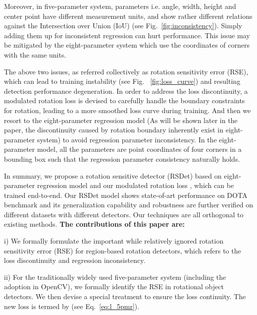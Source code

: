 \documentclass[10pt,twocolumn,letterpaper]{article}
\begin{document}
Moreover, in five-parameter system, parameters i.e. angle, width, height and center point have different measurement units, and show rather different relations against the Intersection over Union (IoU) (see Fig.~\ref{fig:inconsistency}). Simply adding them up for inconsistent regression can hurt performance. This issue may be mitigated by the eight-parameter system which use the coordinates of corners with the same units.

The above two issues, as referred collectively as rotation sensitivity error (RSE), which can lead to training instability (see Fig. ~\ref{fig:loss_curve}) and resulting detection performance degeneration. In order to address the loss discontinuity, a modulated rotation loss  is devised to carefully handle the boundary constraints for rotation, leading to a more smoothed loss curve during training. And then we resort to the eight-parameter regression model  \cite{liao2018rotation,Zhou2017EAST,zhang2019look,he2017deep} (As will be shown later in the paper, the discontinuity caused by rotation boundary inherently exist in eight-parameter system) to avoid regression parameter inconsistency. In the eight-parameter model, all the parameters are point coordinates of four corners in a bounding box such that the regression parameter consistency naturally holds.

In summary, we propose a rotation sensitive detector (RSDet) based on eight-parameter regression model and our modulated rotation loss , which can be trained end-to-end. Our RSDet model shows state-of-art performance on DOTA benchmark and its generalization capability and robustness are further verified on different datasets with different detectors. Our techniques are all orthogonal to existing methods. \textbf{The contributions of this paper are:}


    i) We formally formulate the important while relatively ignored rotation sensitivity error (RSE) for region-based rotation detectors, which refers to the loss discontinuity and regression inconsistency.


    ii) For the traditionally widely used five-parameter system (including the adoption in OpenCV), we formally identify the RSE in rotational object detectors. We then devise a special treatment to ensure the loss continuity. The new loss is termed by  (see Eq.~\ref{eq:l_5pmr}).
\end{document}
